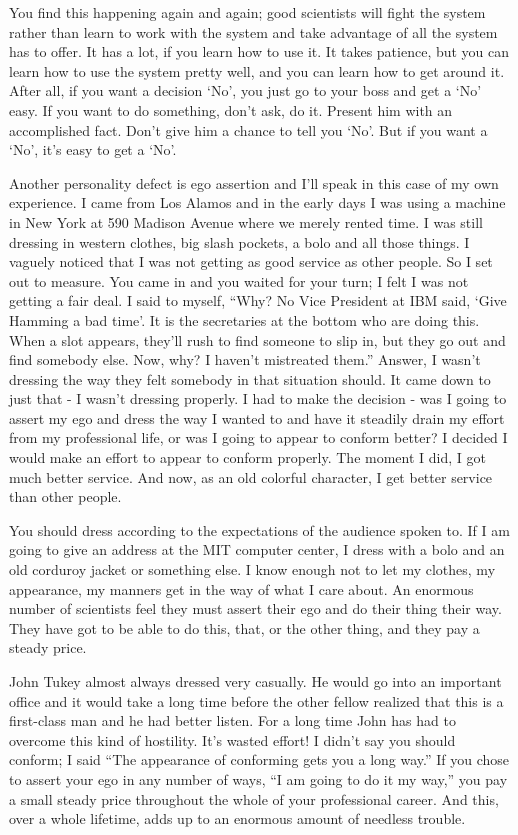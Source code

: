 \documentclass{article}
\begin{document}
You find this happening again and again; good scientists will fight the system rather than learn to work with the system and take advantage of all the system has to offer. It has a lot, if you learn how to use it. It takes patience, but you can learn how to use the system pretty well, and you can learn how to get around it. After all, if you want a decision `No', you just go to your boss and get a `No' easy. If you want to do something, don't ask, do it. Present him with an accomplished fact. Don't give him a chance to tell you `No'. But if you want a `No', it's easy to get a `No'.

Another personality defect is ego assertion and I'll speak in this case of my own experience. I came from Los Alamos and in the early days I was using a machine in New York at 590 Madison Avenue where we merely rented time. I was still dressing in western clothes, big slash pockets, a bolo and all those things. I vaguely noticed that I was not getting as good service as other people. So I set out to measure. You came in and you waited for your turn; I felt I was not getting a fair deal. I said to myself, ``Why? No Vice President at IBM said, `Give Hamming a bad time'. It is the secretaries at the bottom who are doing this. When a slot appears, they'll rush to find someone to slip in, but they go out and find somebody else. Now, why? I haven't mistreated them.'' Answer, I wasn't dressing the way they felt somebody in that situation should. It came down to just that - I wasn't dressing properly. I had to make the decision - was I going to assert my ego and dress the way I wanted to and have it steadily drain my effort from my professional life, or was I going to appear to conform better? I decided I would make an effort to appear to conform properly. The moment I did, I got much better service. And now, as an old colorful character, I get better service than other people.

You should dress according to the expectations of the audience spoken to. If I am going to give an address at the MIT computer center, I dress with a bolo and an old corduroy jacket or something else. I know enough not to let my clothes, my appearance, my manners get in the way of what I care about. An enormous number of scientists feel they must assert their ego and do their thing their way. They have got to be able to do this, that, or the other thing, and they pay a steady price.

John Tukey almost always dressed very casually. He would go into an important office and it would take a long time before the other fellow realized that this is a first-class man and he had better listen. For a long time John has had to overcome this kind of hostility. It's wasted effort! I didn't say you should conform; I said ``The appearance of conforming gets you a long way.'' If you chose to assert your ego in any number of ways, ``I am going to do it my way,'' you pay a small steady price throughout the whole of your professional career. And this, over a whole lifetime, adds up to an enormous amount of needless trouble.
\end{document}
